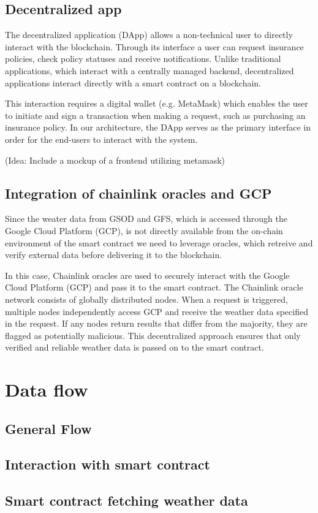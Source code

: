 \subsection{Decentralized app}\label{subsection:decentralizedApp}

The decentralized application (DApp) allows a non-technical user to directly interact with the blockchain. Through its interface a user can request insurance policies, check policy statuses and receive notifications. Unlike traditional applications, which interact with a centrally managed backend, decentralized applications interact directly with a smart contract on a blockchain.

This interaction requires a digital wallet (e.g. MetaMask) which enables the user to initiate and sign a transaction when making a request, such as purchasing an insurance policy. In our architecture, the DApp serves as the primary interface in order for the end-users to interact with the system. 

(Idea: Include a mockup of a frontend utilizing metamask)

\subsection{Integration of chainlink oracles and GCP}\label{subsection:ChainlinkOracle}

Since the weater data from GSOD and GFS, which is accessed through the Google Cloud Platform (GCP), is not directly available from the on-chain environment of the smart contract we need to leverage oracles, which retreive and verify external data before delivering it to the blockchain.

In this case, Chainlink oracles are used to securely interact with the Google Cloud Platform (GCP) and pass it to the smart contract. The Chainlink oracle network consists of globally distributed nodes. When a request is triggered, multiple nodes independently access GCP and receive the weather data specified in the request. If any nodes return results that differ from the majority, they are flagged as potentially malicious. This decentralized approach ensures that only verified and reliable weather data is passed on to the smart contract.


\section{Data flow}

\subsection{General Flow}
\subsection{Interaction with smart contract}
\subsection{Smart contract fetching weather data}